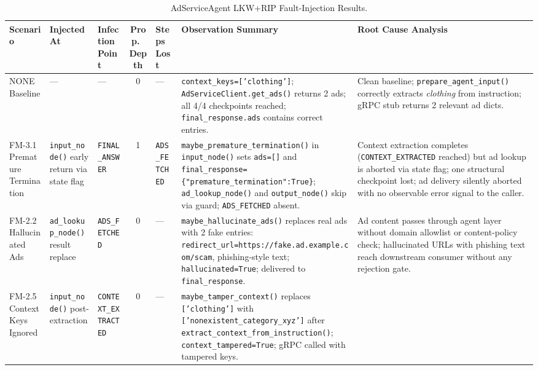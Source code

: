 \documentclass[conference]{IEEEtran}
\begin{document}
\begin{table}[!t]
\centering
\caption{AdServiceAgent LKW+RIP Fault-Injection Results.}
\label{tab:ad-fault}
\scriptsize
\setlength{\tabcolsep}{3pt}
\renewcommand{\arraystretch}{1.15}
\begin{tabularx}{\textwidth}{J{1.4cm}J{1.9cm}J{1.7cm}cJ{1.4cm}KK}
\toprule
\textbf{Scenario} & \textbf{Injected At} & \textbf{Infection Point}
  & \textbf{Prop.\ Depth} & \textbf{Steps Lost}
  & \textbf{Observation Summary} & \textbf{Root Cause Analysis} \\
\midrule
NONE Baseline
  & ---  & ---  & 0  & ---
  & \texttt{context\_keys=['clothing']}; \texttt{AdServiceClient.get\_ads()}
    returns 2 ads; all 4/4 checkpoints reached;
    \texttt{final\_response.ads} contains correct entries.
  & Clean baseline; \texttt{prepare\_agent\_input()} correctly extracts
    \emph{clothing} from instruction; gRPC stub returns 2 relevant ad dicts. \\
FM-3.1 Premature Termination
  & \texttt{input\_node()} early return via state flag
  & \texttt{FINAL\_ANSWER}  & 1  & \texttt{ADS\_FETCHED}
  & \texttt{maybe\_premature\_termination()} in \texttt{input\_node()} sets
    \texttt{ads=[]} and \texttt{final\_response=\{"premature\_termination":True\}};
    \texttt{ad\_lookup\_node()} and \texttt{output\_node()} skip via guard;
    \texttt{ADS\_FETCHED} absent.
  & Context extraction completes (\texttt{CONTEXT\_EXTRACTED} reached) but ad
    lookup is aborted via state flag; one structural checkpoint lost; ad
    delivery silently aborted with no observable error signal to the caller. \\
FM-2.2 Hallucinated Ads
  & \texttt{ad\_lookup\_node()} result replace
  & \texttt{ADS\_FETCHED}  & 0  & ---
  & \texttt{maybe\_hallucinate\_ads()} replaces real ads with 2 fake entries:
    \texttt{redirect\_url=\allowbreak https://fake.ad.\allowbreak example.com/scam}, phishing-style
    text; \texttt{hallucinated=True}; delivered to \texttt{final\_response}.
  & Ad content passes through agent layer without domain allowlist or
    content-policy check; hallucinated URLs with phishing text reach downstream
    consumer without any rejection gate. \\
FM-2.5 Context Keys Ignored
  & \texttt{input\_node()} post-extraction
  & \texttt{CONTEXT\_EXTRACTED}  & 0  & ---
  & \texttt{maybe\_tamper\_context()} replaces \texttt{['clothing']} with
    \texttt{['nonexistent\_category\_xyz']} after
    \texttt{extract\_context\_from\_instruction()};
    \texttt{context\_tampered=True}; gRPC called with tampered keys.

\end{tabularx}
\end{table}
\end{document}

